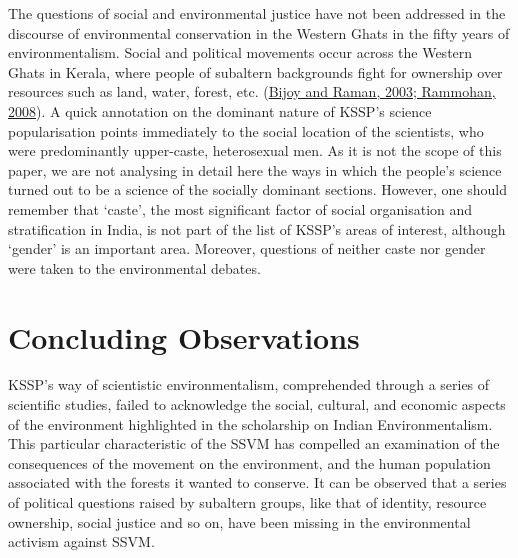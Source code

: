 \documentclass[twoside, 13pt]{article}
\begin{document}
{{{{{\fontsize{12}{14}\selectfont The questions of social and environmental justice have not been addressed in the discourse of environmental conservation in the Western Ghats in the fifty years of environmentalism. Social and political movements occur across the Western Ghats in Kerala, where people of subaltern backgrounds fight for ownership over resources such as land, water, forest, etc. (\underline{Bijoy and Raman, 2003; Rammohan, 2008}). A quick annotation on the dominant nature of KSSP’s science popularisation points immediately to the social location of the scientists, who were predominantly upper-caste, heterosexual men. As it is not the scope of this paper, we are not analysing in detail here the ways in which the people’s science turned out to be a science of the socially dominant sections. However, one should remember that ‘caste’, the most significant factor of social organisation and stratification in India, is not part of the list of KSSP’s areas of interest, although ‘gender’ is an important area. Moreover, questions of neither caste nor gender were taken to the environmental debates. }


\vspace{-.7cm}

{\fontsize{18}{20}\selectfont\section*{Concluding Observations}}

\vspace{-.2cm}

{\fontsize{12}{14}\selectfont KSSP’s way of scientistic environmentalism, comprehended through a series of scientific studies, failed to acknowledge the social, cultural, and economic aspects of the environment highlighted in the scholarship on Indian Environmentalism. This particular characteristic of the SSVM has compelled an examination of the consequences of the movement on the environment, and the human population associated with the forests it wanted to conserve. It can be observed that a series of political questions raised by subaltern groups, like that of identity, resource ownership, social justice and so on, have been missing in the environmental activism against SSVM. 

}}}}}
\end{document}
